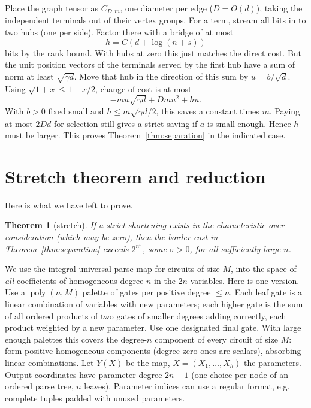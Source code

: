 \documentclass[11pt,letterpaper]{article}
\newtheorem{theorem}{Theorem}[section]
\theoremstyle{definition}
\numberwithin{equation}{section}
\DeclareMathOperator{\poly}{poly}
\begin{document}
Place the graph tensor as $C_{D,m}$, one diameter per edge ($D=O(d)$), taking the independent
terminals out of their vertex groups. For a term, stream all bits in to two hubs (one
per side). Factor there with a bridge of at most
\[
  h=C(d+\log(n+s))
\]
bits by the rank bound. With hubs at zero this just matches the direct cost. But the unit
position vectors of the terminals served by the first hub have a sum of norm at least $\sqrt{\gamma d}$.
Move that hub in the direction of this sum by $u=b/\sqrt{d}$. Using $\sqrt{1+x}\le 1+x/2$, change
of cost is at most
\[
  -mu\sqrt{\gamma d} + Dmu^2+ hu.
\]
With $b>0$ fixed small and $h\le m\sqrt{\gamma d}/2$, this saves a constant times $m$. Paying at most
$2Dd$ for selection still gives a strict saving if $a$ is small enough. Hence $h$ must be larger.
This proves Theorem~\ref{thm:separation} in the indicated case.

\section{Stretch theorem and reduction}\label{sec:stretch}

Here is what we have left to prove.

\begin{theorem}[stretch]\label{thm:stretch}
If a strict shortening exists in the characteristic over consideration
(which may be zero), then the border cost in Theorem~\ref{thm:separation} exceeds $2^{n^\sigma}$,
some $\sigma >0$, for all
sufficiently large $n$.
\end{theorem}

We use the integral universal parse map for circuits of size $M$, into the space of \emph{all}
coefficients of homogeneous degree $n$ in the $2n$ variables. Here is one version. Use a
$\poly(n,M)$ palette of gates per positive degree $\le n$. Each leaf gate is a linear combination
of variables with new parameters; each higher gate is the sum of all ordered products of two
gates of smaller degrees adding correctly, each product weighted by a new parameter. Use
one designated final gate. With large enough palettes this covers the degree-$n$ component
of every circuit of size $M$: form positive homogeneous components (degree-zero ones are
scalars), absorbing linear combinations. Let $Y(X)$ be the map, $X=(X_1,\ldots,X_h)$ the
parameters. Output coordinates have parameter degree $2n-1$ (one choice per node of an
ordered parse tree, $n$ leaves). Parameter indices can use a regular format, e.g. complete
tuples padded with unused parameters.
\end{document}
